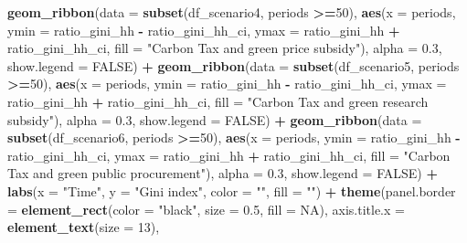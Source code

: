 \documentclass[
]{article}
\newenvironment{Shaded}{\begin{snugshade}}{\end{snugshade}}
\newcommand{\AttributeTok}[1]{\textcolor[rgb]{0.13,0.29,0.53}{#1}}
\newcommand{\ConstantTok}[1]{\textcolor[rgb]{0.56,0.35,0.01}{#1}}
\newcommand{\DecValTok}[1]{\textcolor[rgb]{0.00,0.00,0.81}{#1}}
\newcommand{\FloatTok}[1]{\textcolor[rgb]{0.00,0.00,0.81}{#1}}
\newcommand{\FunctionTok}[1]{\textcolor[rgb]{0.13,0.29,0.53}{\textbf{#1}}}
\newcommand{\NormalTok}[1]{#1}
\newcommand{\SpecialCharTok}[1]{\textcolor[rgb]{0.81,0.36,0.00}{\textbf{#1}}}
\newcommand{\StringTok}[1]{\textcolor[rgb]{0.31,0.60,0.02}{#1}}
\begin{document}
\begin{Shaded}
\begin{Highlighting}[]
  \FunctionTok{geom\_ribbon}\NormalTok{(}\AttributeTok{data =} \FunctionTok{subset}\NormalTok{(df\_scenario4, periods }\SpecialCharTok{\textgreater{}=}\DecValTok{50}\NormalTok{), }\FunctionTok{aes}\NormalTok{(}\AttributeTok{x =}\NormalTok{ periods, }\AttributeTok{ymin =}\NormalTok{ ratio\_gini\_hh }\SpecialCharTok{{-}}\NormalTok{ ratio\_gini\_hh\_ci, }\AttributeTok{ymax =}\NormalTok{ ratio\_gini\_hh }\SpecialCharTok{+}\NormalTok{ ratio\_gini\_hh\_ci, }\AttributeTok{fill =} \StringTok{"Carbon Tax and green price subsidy"}\NormalTok{), }\AttributeTok{alpha =} \FloatTok{0.3}\NormalTok{, }\AttributeTok{show.legend =} \ConstantTok{FALSE}\NormalTok{) }\SpecialCharTok{+}
  \FunctionTok{geom\_ribbon}\NormalTok{(}\AttributeTok{data =} \FunctionTok{subset}\NormalTok{(df\_scenario5, periods }\SpecialCharTok{\textgreater{}=}\DecValTok{50}\NormalTok{), }\FunctionTok{aes}\NormalTok{(}\AttributeTok{x =}\NormalTok{ periods, }\AttributeTok{ymin =}\NormalTok{ ratio\_gini\_hh }\SpecialCharTok{{-}}\NormalTok{ ratio\_gini\_hh\_ci, }\AttributeTok{ymax =}\NormalTok{ ratio\_gini\_hh }\SpecialCharTok{+}\NormalTok{ ratio\_gini\_hh\_ci, }\AttributeTok{fill =} \StringTok{"Carbon Tax and green research subsidy"}\NormalTok{), }\AttributeTok{alpha =} \FloatTok{0.3}\NormalTok{, }\AttributeTok{show.legend =} \ConstantTok{FALSE}\NormalTok{) }\SpecialCharTok{+}
  \FunctionTok{geom\_ribbon}\NormalTok{(}\AttributeTok{data =} \FunctionTok{subset}\NormalTok{(df\_scenario6, periods }\SpecialCharTok{\textgreater{}=}\DecValTok{50}\NormalTok{), }\FunctionTok{aes}\NormalTok{(}\AttributeTok{x =}\NormalTok{ periods, }\AttributeTok{ymin =}\NormalTok{ ratio\_gini\_hh }\SpecialCharTok{{-}}\NormalTok{ ratio\_gini\_hh\_ci, }\AttributeTok{ymax =}\NormalTok{ ratio\_gini\_hh }\SpecialCharTok{+}\NormalTok{ ratio\_gini\_hh\_ci, }\AttributeTok{fill =} \StringTok{"Carbon Tax and green public procurement"}\NormalTok{), }\AttributeTok{alpha =} \FloatTok{0.3}\NormalTok{, }\AttributeTok{show.legend =} \ConstantTok{FALSE}\NormalTok{) }\SpecialCharTok{+}
  \FunctionTok{labs}\NormalTok{(}\AttributeTok{x =} \StringTok{"Time"}\NormalTok{, }\AttributeTok{y =} \StringTok{"Gini index"}\NormalTok{, }\AttributeTok{color =} \StringTok{""}\NormalTok{, }\AttributeTok{fill =} \StringTok{""}\NormalTok{) }\SpecialCharTok{+}
  \FunctionTok{theme}\NormalTok{(}\AttributeTok{panel.border =} \FunctionTok{element\_rect}\NormalTok{(}\AttributeTok{color =} \StringTok{"black"}\NormalTok{, }\AttributeTok{size =} \FloatTok{0.5}\NormalTok{, }\AttributeTok{fill =} \ConstantTok{NA}\NormalTok{),}
        \AttributeTok{axis.title.x =} \FunctionTok{element\_text}\NormalTok{(}\AttributeTok{size =} \DecValTok{13}\NormalTok{),}

\end{Highlighting}
\end{Shaded}
\end{document}
